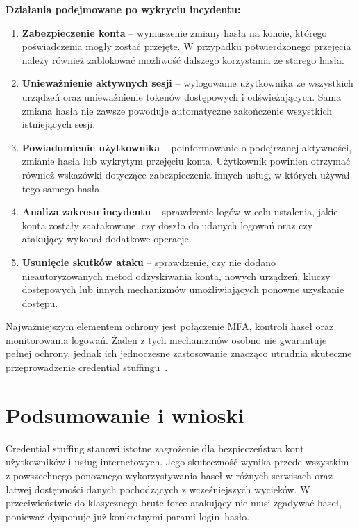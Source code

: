 \documentclass[12pt,a4paper]{article}
\begin{document}
\textbf{Działania podejmowane po wykryciu incydentu:}

\begin{enumerate}
    \item \textbf{Zabezpieczenie konta} -- wymuszenie zmiany hasła na koncie, którego poświadczenia mogły zostać przejęte. W przypadku potwierdzonego przejęcia należy również zablokować możliwość dalszego korzystania ze starego hasła.

    \item \textbf{Unieważnienie aktywnych sesji} -- wylogowanie użytkownika ze wszystkich urządzeń oraz unieważnienie tokenów dostępowych i odświeżających. Sama zmiana hasła nie zawsze powoduje automatyczne zakończenie wszystkich istniejących sesji.

    \item \textbf{Powiadomienie użytkownika} -- poinformowanie o podejrzanej aktywności, zmianie hasła lub wykrytym przejęciu konta. Użytkownik powinien otrzymać również wskazówki dotyczące zabezpieczenia innych usług, w których używał tego samego hasła.

    \item \textbf{Analiza zakresu incydentu} -- sprawdzenie logów w celu ustalenia, jakie konta zostały zaatakowane, czy doszło do udanych logowań oraz czy atakujący wykonał dodatkowe operacje.

    \item \textbf{Usunięcie skutków ataku} -- sprawdzenie, czy nie dodano nieautoryzowanych metod odzyskiwania konta, nowych urządzeń, kluczy dostępowych lub innych mechanizmów umożliwiających ponowne uzyskanie dostępu.
\end{enumerate}

Najważniejszym elementem ochrony jest połączenie MFA, kontroli haseł oraz monitorowania logowań. Żaden z tych mechanizmów osobno nie gwarantuje pełnej ochrony, jednak ich jednoczesne zastosowanie znacząco utrudnia skuteczne przeprowadzenie credential stuffingu~\cite{owasp_cs,nist80063b,owasp_mfa}.

\newpage

\section{Podsumowanie i wnioski}

Credential stuffing stanowi istotne zagrożenie dla bezpieczeństwa kont użytkowników i usług internetowych. Jego skuteczność wynika przede wszystkim z powszechnego ponownego wykorzystywania haseł w różnych serwisach oraz łatwej dostępności danych pochodzących z wcześniejszych wycieków. W przeciwieństwie do klasycznego brute force atakujący nie musi zgadywać haseł, ponieważ dysponuje już konkretnymi parami login--hasło.
\end{document}
